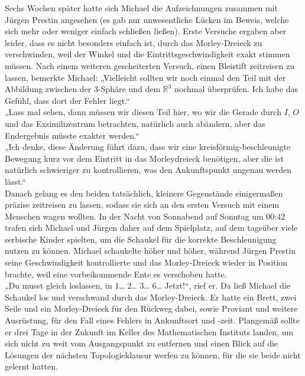\documentclass[oneside]{memoir}
\begin{document}
Sechs Wochen später hatte sich Michael die Aufzeichnungen zusammen mit Jürgen Prestin angesehen (es gab nur unwesentliche Lücken im Beweis, welche sich mehr oder weniger einfach schließen ließen). Erste Versuche ergaben aber leider, dass es nicht besonders einfach ist, durch das Morley-Dreieck zu verschwinden, weil der Winkel und die Eintrittsgeschwindigkeit exakt stimmen müssen. Nach einem weiteren gescheiterten Versuch, einen Bleistift zeitreisen zu lassen, bemerkte Michael: „Vielleicht sollten wir noch einmal den Teil mit der Abbildung zwischen der 3-Sphäre und dem $\mathbb{R}^3$ nochmal  überprüfen. Ich habe das Gefühl, dass dort der Fehler liegt.“ \\
„Lass mal sehen, dann müssen wir diesen Teil hier, wo wir die Gerade durch $I$, $O$ und das Exsimilizentrum betrachten, natürlich auch abändern, aber das Endergebnis müsste exakter werden.“ \\
„Ich denke, diese Änderung führt dazu, dass wir eine kreisförmig-beschleunigte Bewegung kurz vor dem Eintritt in das Morleydreieck benötigen, aber die ist natürlich schwieriger zu kontrollieren, was den Ankunftspunkt ungenau werden lässt.“ \\
Danach gelang es den beiden tatsächlich, kleinere Gegenstände einigermaßen präzise zeitreisen zu lassen, sodass sie sich an den ersten Versuch mit einem Menschen wagen wollten. In der Nacht von Sonnabend auf Sonntag um 00:42 trafen sich Michael und Jürgen daher auf dem Spielplatz, auf dem tagsüber viele serbische Kinder spielten, um die Schaukel für die korrekte Beschleunigung nutzen zu können. Michael schaukelte höher und höher, während Jürgen Prestin seine Geschwindigkeit kontrollierte und das Morley-Dreieck wieder in Position brachte, weil eine vorbeikommende Ente es verschoben hatte. \\
„Du musst gleich loslassen, in 1\ldots{} 2\ldots{} 3\ldots{} 6\ldots{} Jetzt!“, rief er. Da ließ Michael die Schaukel los und verschwand durch das Morley-Dreieck. Er hatte ein Brett, zwei Seile und ein Morley-Dreieck für den Rückweg dabei, sowie Proviant und weitere Ausrüstung, für den Fall eines Fehlers in Ankunftsort und -zeit. Plangemäß sollte er drei Tage in der Zukunft im Keller des Mathematischen Instituts landen, um sich nicht zu weit vom Ausgangspunkt zu entfernen und einen Blick auf die Lösungen der nächsten Topologieklausur werfen zu können, für die sie beide nicht gelernt hatten. \\
\end{document}
